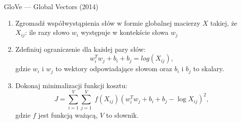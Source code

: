 \documentclass{beamer}
\begin{document}
	\begin{frame}{GloVe --- Global Vectors (2014)}


\begin{enumerate}
	\item Zgromadź współwystąpienia słów w formie globalnej macierzy $X$ takiej, że
	$X_{ij}$: ile razy słowo $w_i$ występuje w kontekście słowa $w_j$

	\item Zdefiniuj ograniczenie dla każdej pary słów: 
	\begin{equation}
	w_i^Tw_j + b_i + b_j = log(X_{ij}),
	\end{equation}
	gdzie $w_i$ i $w_j$ to wektory odpowiadające słowom oraz $b_i$ i $b_j$ to skalary.

	\item Dokonaj minimalizacji funkcji kosztu:
	\begin{equation}
	\label{eq:glove_loss}
	J = \sum_{i=1}^V \sum_{j=1}^V \; f(X_{ij}) ( w_i^T w_j + b_i + b_j - \log X_{ij})^2,
	\end{equation}
	gdzie $f$ jest funkcją ważącą, $V$ to słownik.

\end{enumerate}
	\end{frame}
\end{document}
